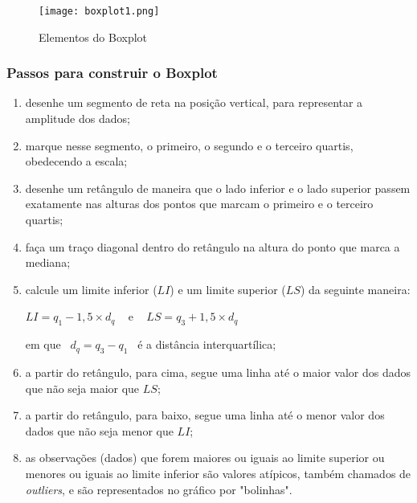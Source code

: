 \documentclass[11pt,fleqn]{book} %
\begin{document}
\begin{figure}[h!]
\centering\texttt{[image: boxplot1.png]}
\caption{Elementos do Boxplot}
\label{fig:boxplot1} %
\end{figure}


\subsubsection{Passos para construir o Boxplot}
\vspace{0,3cm}

\begin{enumerate}
\item desenhe um segmento de reta na posição vertical, para representar a amplitude dos dados;

\item marque nesse segmento, o primeiro, o segundo e o terceiro quartis, obedecendo a escala;

\item desenhe um retângulo de maneira que o lado inferior e o lado superior passem exatamente nas alturas dos pontos que marcam o primeiro e o terceiro quartis;

\item faça um traço diagonal dentro do retângulo na altura do ponto que marca a mediana;

\item calcule um limite inferior ($LI$) e um limite superior ($LS$) da seguinte maneira:
\begin{center}
$LI=q_1-1,5 \times d_q$ \,\,\, e  \,\,\,  $LS=q_3+1,5 \times d_q$
\end{center}

\noindent em que \, $d_q=q_3-q_1$ \, é  a distância interquartílica;
	
\item a partir do retângulo, para cima, segue uma linha até o maior valor dos dados que não seja maior que $LS$;

\item a partir do retângulo, para baixo, segue uma linha até o menor valor dos dados que não seja menor que $LI$;

\item as observações (dados) que forem maiores ou iguais ao limite superior ou menores ou iguais ao limite inferior são valores atípicos, também chamados de {\itshape outliers}, e são representados no gráfico por "bolinhas". \\
\end{enumerate}
\end{document}
